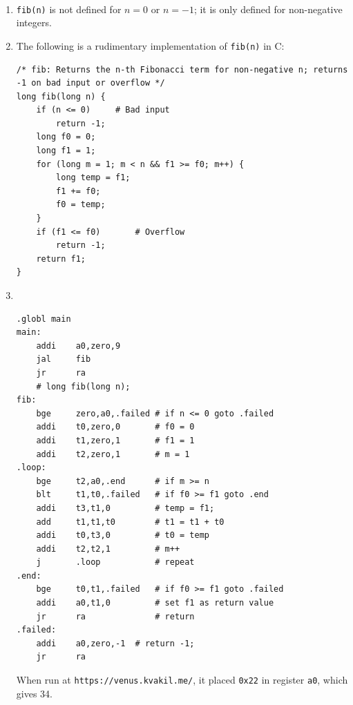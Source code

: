 \documentclass[12pt]{article}
\newenvironment{sol}[1][Solution]{\begin{trivlist}
		\item[\hskip \labelsep {\bfseries #1:}]}{\end{trivlist}}
\begin{document}
\begin{sol}
	\
	\begin{enumerate}[label=(\alph*)]
		\item \texttt{fib(n)} is not defined for $n=0$ or $n=-1$; it is only
		defined for non-negative integers.
		\item The following is a rudimentary implementation of \texttt{fib(n)} in C:
		\begin{lstlisting}
/* fib: Returns the n-th Fibonacci term for non-negative n; returns -1 on bad input or overflow */
long fib(long n) {
	if (n <= 0)		# Bad input
		return -1;
	long f0 = 0;
	long f1 = 1;
	for (long m = 1; m < n && f1 >= f0; m++) {
		long temp = f1;
		f1 += f0;
		f0 = temp;
	}
	if (f1 <= f0)		# Overflow
		return -1;
	return f1;
}
		\end{lstlisting}
		\item 
		\
		\begin{lstlisting}[language={}]
.globl main
main:
	addi	a0,zero,9
	jal		fib
	jr		ra
	# long fib(long n);
fib:
	bge		zero,a0,.failed	# if n <= 0 goto .failed
	addi	t0,zero,0		# f0 = 0
	addi	t1,zero,1		# f1 = 1
	addi	t2,zero,1		# m = 1
.loop:
	bge		t2,a0,.end		# if m >= n
	blt		t1,t0,.failed	# if f0 >= f1 goto .end
	addi	t3,t1,0			# temp = f1;
	add		t1,t1,t0		# t1 = t1 + t0
	addi	t0,t3,0			# t0 = temp
	addi	t2,t2,1			# m++
	j		.loop			# repeat
.end:
	bge		t0,t1,.failed	# if f0 >= f1 goto .failed
	addi	a0,t1,0			# set f1 as return value
	jr		ra				# return
.failed:
	addi	a0,zero,-1	# return -1;
	jr		ra
		\end{lstlisting}
	When run at \texttt{https://venus.kvakil.me/}, it placed \texttt{0x22} in register \texttt{a0}, which gives 34.
	\end{enumerate}
\end{sol}
\end{document}
